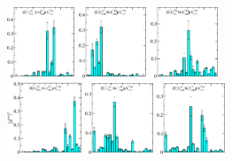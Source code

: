 \begin{figure}[H]
    \includegraphics[width=0.18\textwidth]{figures/sigmas/g1u/zfactors/zfactor_isotriplet_kbar_delta-G1u_1-P001-A2-SS_1-P00-1-G1-SS_0.pdf}
    \includegraphics[width=0.18\textwidth]{figures/sigmas/g1u/zfactors/zfactor_isotriplet_kbar_nucleon-G1u_1-P000-A1u-SS_0-P000-G1g-SS_0.pdf}
    \includegraphics[width=0.18\textwidth]{figures/sigmas/g1u/zfactors/zfactor_isotriplet_kbar_nucleon-G1u_1-P000-T1u-SS_1-P000-G1g-SS_0.pdf}\\
    \includegraphics[width=0.1975\textwidth]{figures/sigmas/g1u/zfactors/zfactor_isotriplet_kbar_nucleon-G1u_1-P001-A2-SS_0-P00-1-G1-SS_0.pdf}
    \includegraphics[width=0.18\textwidth]{figures/sigmas/g1u/zfactors/zfactor_isotriplet_kbar_nucleon-G1u_1-P001-A2-SS_1-P00-1-G1-SS_0.pdf}
    \includegraphics[width=0.18\textwidth]{figures/sigmas/g1u/zfactors/zfactor_isotriplet_kbar_nucleon-G1u_1-P011-A2-SS_0-P0-1-1-G-SS_0.pdf}

\end{figure}
